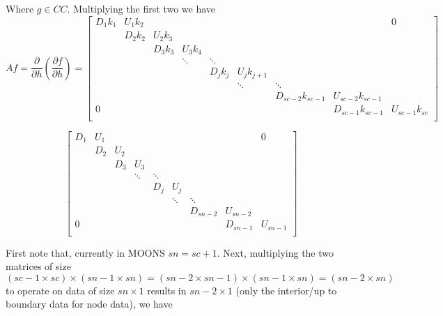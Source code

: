 \documentclass[11pt]{article}
\begin{document}
Where $g \in CC$. Multiplying the first two we have
\[
Af =
\frac{\partial}{\partial h} \left( \frac{\partial f}{\partial h} \right)
=
\left[
\begin{array}{ccccccccc}
D_{1} k_{1} & U_{1} k_{2} &  &   &   &   &   &   & 0 \\
  & D_{2} k_{2} & U_{2} k_{3} &   &   &   &   &   &   \\
  &   & D_{3} k_{3} & U_{3} k_{4} &   &   &   &   &   \\
  &   &  & \ddots & \ddots &   &   &   &   \\
  &   &   &   & D_{j} k_{j} & U_{j} k_{j+1} &   &   &   \\
  &   &   &   &  & \ddots & \ddots &   &   \\
  &   &   &   &   &   & D_{sc-2} k_{sc-1} & U_{sc-2} k_{sc-1} &   \\
 0 &   &   &   &   &   &   & D_{sc-1} k_{sc-1} & U_{sc-1} k_{sc} \\
\end{array}
\right]
\]

\[
\left[
\begin{array}{ccccccccc}
D_{1} & U_{1} &  &   &   &   &   &   & 0 \\
  & D_{2} & U_{2} &   &   &   &   &   &   \\
  &   & D_{3} & U_{3} &   &   &   &   &   \\
  &   &  & \ddots & \ddots &   &   &   &   \\
  &   &   &   & D_{j} & U_{j} &   &   &   \\
  &   &   &   &  & \ddots & \ddots &   &   \\
  &   &   &   &   &   & D_{sn-2} & U_{sn-2} &   \\
 0 &   &   &   &   &   &   & D_{sn-1} & U_{sn-1} \\
\end{array}
\right]
\]

First note that, currently in MOONS $sn = sc + 1$. Next, multiplying the two matrices of size
$(sc-1 \times sc) \times (sn-1 \times sn) = (sn-2 \times sn-1) \times (sn-1 \times sn) = (sn-2 \times sn)$ to operate on data of size $sn \times 1$ results in $sn-2 \times 1$ (only the interior/up to boundary data for node data), we have
\end{document}
